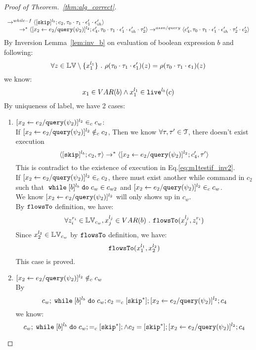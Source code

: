 \begin{proof}[Proof of Theorem.~\ref{thm:alg_correct}]
\begin{case}
\begin{subcase}
\begin{subsubcase}
\begin{subsubsubcase}
\begin{subproof}
\[\begin{array}{l}
  \rightarrow^{while-f} 
  \langle [\mathtt{skip}]^{l_b};c_2, \mathtt{\tau}_0 \cdot \mathtt{\tau}_1 \cdot \mathtt{\epsilon}_1' \cdot \mathtt{\epsilon}_{ih}' \rangle 
  \\
  \qquad \rightarrow^{*} 
  \langle [\mathrel{ {x}_2 \leftarrow e_2 / {\tt query}(\psi_2) }]^{l_2};{c}_4', 
  \mathtt{\tau}_0 \cdot \mathtt{\tau}_1 \cdot \mathtt{\epsilon}_1' \cdot \mathtt{\epsilon}_{ih}' \cdot \mathtt{\tau}_2' \rangle
  \rightarrow^{assn/query} 
  \langle {c}_4',  \mathtt{\tau}_0 \cdot \mathtt{\tau}_1 \cdot \mathtt{\epsilon}_1' \cdot \mathtt{\epsilon}_{ih}' \cdot \mathtt{\tau}_2' \cdot \mathtt{\epsilon}_2' \rangle 
\end{array}
 \]
By Inversion Lemma~\ref{lem:inv_b} on evaluation of boolean expression $b$ and following: 
\[
  \forall z \in \mathbb{LV} \setminus \{x_1^{l_1}\} ~.~
  \rho(\mathtt{\tau}_0 \cdot \mathtt{\tau}_1 \cdot \mathtt{\epsilon}_1')(z) = \rho(\mathtt{\tau}_0 \cdot \mathtt{\tau}_1 \cdot \mathtt{\epsilon}_1)(z)
\]
we know:
\[
  x_1 \in VAR(b) \land x_1^{l_1} \in \mathtt{live}^{l_b}(c)
\]
%
 By uniqueness of label, we have 2 cases:
 \begin{enumerate}
 \item $[\mathrel{ {x}_2 \leftarrow e_2 / {\tt query}(\psi_2) }]^{l_2} \in_c c_w$:
 \\
 If $[\mathrel{ {x}_2 \leftarrow e_2 / {\tt query}(\psi_2) }]^{l_2} \notin_c c_2$,
 Then we know $\forall \mathtt{\tau}, \mathtt{\tau}' \in \mathcal{T}$, there doesn't exist execution
 \[
  \langle [\mathtt{skip}]^{l_b};c_2, \mathtt{\tau} \rangle \rightarrow^{*} 
  \langle [\mathrel{ {x}_2 \leftarrow e_2 / {\tt query}(\psi_2) }]^{l_2};{c}_4', \mathtt{\tau}' \rangle
 \]
 This is contradict to the existence of execution in Eq.\ref{eq:m1testif_inv2}.
 \\
  If $[\mathrel{ {x}_2 \leftarrow e_2 / {\tt query}(\psi_2) }]^{l_2} \in_c c_2$, there must exist another while command
   in $c_2$ such that 
  $\;\mathtt{while}\; [b]^{l_b} \;\mathtt{do}\; c_w \in c_{w2}$ and $[\mathrel{ {x}_2 \leftarrow e_2 / {\tt query}(\psi_2) }]^{l_2} \in_c c_w$.
  \\
  We know $[\mathrel{ {x}_2 \leftarrow e_2 / {\tt query}(\psi_2) }]^{l_2}$ will only shows up in $c_w$.
  \\
  By $\mathtt{flowsTo}$ definition, we have:
  \[
    \forall z_i^{r_i} \in \mathbb{LV}_{c_w}, x_j^{l_j} \in VAR(b) ~.~
    \mathtt{flowsTo}(x_j^{l_j}, z_i^{r_i})
  \]
  Since $x_2^{l_2} \in \mathbb{LV}_{c_w}$ by $\mathtt{flowsTo}$ definition, we have: 
  \[
    \mathtt{flowsTo}(x_1^{l_1}, x_2^{l_2})
  \]
  This case is proved.
 \item $[\mathrel{ {x}_2 \leftarrow e_2 / {\tt query}(\psi_2) }]^{l_2} \notin_c c_w$
 \\
 By
 \[
  c_w;\;\mathtt{while}\; [b]^{l_b} \;\mathtt{do}\; c_w; c_2 =_c [\mathtt{skip}^*]; [\mathrel{ {x}_2 \leftarrow e_2 / {\tt query}(\psi_2) }]^{l_2};{c}_4
\]
we know:
\[
  c_w;\;\mathtt{while}\; [b]^{l_b} \;\mathtt{do}\; c_w; =_c [\mathtt{skip}^*]; \land c_2 = [\mathtt{skip}^*]; [\mathrel{ {x}_2 \leftarrow e_2 / {\tt query}(\psi_2) }]^{l_2};{c}_4
\]
\end{enumerate}
\end{subproof}
\end{subsubsubcase}
\end{subsubcase}
\end{subcase}
\end{case}
\end{proof}

